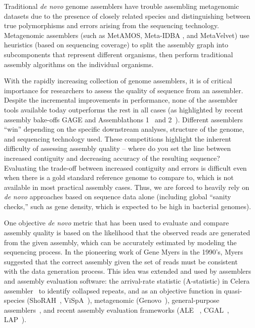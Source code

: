 \documentclass[conference]{IEEEtran}
\begin{document}
Traditional \emph{de novo} genome assemblers have trouble assembling metagenomic datasets due to the presence of closely related species and distinguishing between true polymorphisms and errors arising from the sequencing technology.
Metagenomic assemblers (such as MetAMOS\cite{treangen2013metamos}, Meta-IDBA \cite{peng2011meta}, and MetaVelvet\cite{namiki2012metavelvet}) use heuristics (based on sequencing coverage) to split the assembly graph into subcomponents that represent different organisms, then perform traditional assembly algorithms on the individual organisms.

With the rapidly increasing collection of genome assemblers, it is of critical importance for researchers to assess the quality of sequence from an assembler.
Despite the incremental improvements in performance, none of the assembler tools available today outperforms the rest in all cases (as highlighted by recent assembly
bake-offs GAGE\cite{salzberg2011gage} and Assemblathons 1~\cite{earl2011assemblathon} and 2~\cite{bradnam2013assemblathon}).
Different assemblers ``win'' depending on the specific downstream analyses, structure of the genome, and sequencing technology used.
These competitions highlight the inherent difficulty of assessing assembly quality -- where do you set the line between increased contiguity and decreasing accuracy of the resulting sequence?
Evaluating the trade-off between increased contiguity and errors is difficult even when there is a gold standard reference genome to compare to, which is not available in most practical assembly cases.
Thus, we are forced to heavily rely on \emph{de novo} approaches based on sequence data alone (including global ``sanity checks,'' such as gene density, which is expected to be high in bacterial genomes).

One objective \emph{de novo} metric that has been used to evaluate and compare assembly quality is based on the likelihood that the observed reads are generated from the given assembly, which can be accurately estimated by modeling the sequencing process.
In the pioneering work of Gene Myers in the 1990's, Myers suggested that the correct assembly given the set of reads must be consistent with the data generation process.
This idea was extended and used by assemblers and assembly evaluation software: the arrival-rate statistic (A-statistic) in Celera
assembler~\cite{CeleraAssembler} to identify collapsed repeats, and
as an objective function in quasi-species (ShoRAH~\cite{SHORAH},
ViSpA~\cite{VISPA}), metagenomic (Genovo~\cite{genovo2011}),
general-purpose assemblers~\cite{medvedev2009maximum}, and recent assembly
evaluation frameworks (ALE ~\cite{clark2013ale}, CGAL~\cite{rahman2013cgal}, LAP~\cite{LAP}).
\end{document}
